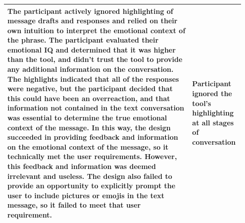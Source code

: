 \documentclass[acmsmall,screen,authorversion,nonacm]{acmart}
\begin{document}
\begin{center}
\begin{longtable}{|p{0.75\linewidth}|p{0.2\linewidth}|}
    The participant actively ignored highlighting of message drafts and responses and relied on their own intuition to interpret the emotional context of the phrase. The participant evaluated their emotional IQ and determined that it was higher than the tool, and didn’t trust the tool to provide any additional information on the conversation. The highlights indicated that all of the responses were negative, but the participant decided that this could have been an overreaction, and that information not contained in the text conversation was essential to determine the true emotional context of the message. In this way, the design succeeded in providing feedback and information on the emotional context of the message, so it technically met the user requirements. However, this feedback and information was deemed irrelevant and useless. The design also failed to provide an opportunity to explicitly prompt the user to include pictures or emojis in the text message, so it failed to meet that user requirement. & Participant ignored the tool's highlighting at all stages of conversation \\ \hline
    \end{longtable}
\end{center}
\end{document}
